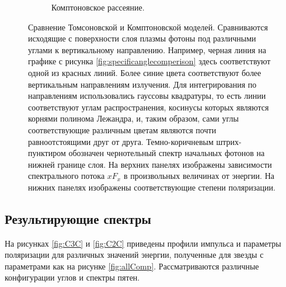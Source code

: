 \documentclass[14pt,a4paper]{extarticle}
\begin{document}
\begin{figure}[H]
\begin{subfigure}{.5\textwidth}
					\caption{\small\centering Комптоновское рассеяние.}\label{fig:Comp3}
				\end{subfigure}
				\caption{\small
					Сравнение Томсоновской и Комптоновской моделей. 
					Сравниваются исходящие с поверхности слоя плазмы фотоны под
					различными углами к вертикальному направлению. Например, черная линия на графике с рисунка \ref{fig:specificanglecomperison} здесь соответствуют одной из красных линий. Более синие цвета соответствуют более вертикальным направлениям излучения. 
					Для интегрирования по направлениям использовались гауссовы квадратуры, то есть линии соответствуют углам распространения, косинусы которых являются корнями полинома Лежандра, и, таким образом, сами углы соответствующие различным цветам являются почти равноотстоящими друг от друга. 
					Темно-коричневым штрих-пунктиром обозначен чернотельный спектр начальных фотонов на нижней границе слоя. 
					На верхних панелях изображены зависимости спектрального потока $xF_x$ в произвольных величинах от энергии.  
					На нижних панелях изображены соответствующие степени поляризации.
					}\label{fig:allcomparison}
			\end{figure}\newpage


		\subsection{Результирующие спектры}\label{sub:SI}

		На рисунках \ref{fig:C3C} и \ref{fig:C2C} приведены профили импульса и параметры поляризации для различных значений энергии, полученные для звезды с параметрами как на рисунке \ref{fig:allComp}. Рассматриваются различные конфигурации углов и спектры пятен. 
\end{document}
